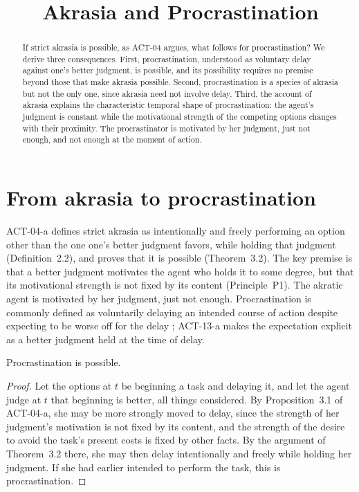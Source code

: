 \documentclass{situationist-preprint}
\title{Akrasia and Procrastination}
\begin{document}
\maketitle

\begin{abstract}
If strict akrasia is possible, as ACT-04 argues, what follows for procrastination? We derive three consequences. First, procrastination, understood as voluntary delay against one's better judgment, is possible, and its possibility requires no premise beyond those that make akrasia possible. Second, procrastination is a species of akrasia but not the only one, since akrasia need not involve delay. Third, the account of akrasia explains the characteristic temporal shape of procrastination: the agent's judgment is constant while the motivational strength of the competing options changes with their proximity. The procrastinator is motivated by her judgment, just not enough, and not enough at the moment of action.
\end{abstract}

\section{From akrasia to procrastination}

ACT-04-a defines strict akrasia as intentionally and freely performing an option other than the one one's better judgment favors, while holding that judgment (Definition~2.2), and proves that it is possible (Theorem~3.2). The key premise is that a better judgment motivates the agent who holds it to some degree, but that its motivational strength is not fixed by its content (Principle~P1). The akratic agent is motivated by her judgment, just not enough. Procrastination is commonly defined as voluntarily delaying an intended course of action despite expecting to be worse off for the delay \citep{Steel2007}; ACT-13-a makes the expectation explicit as a better judgment held at the time of delay.

\begin{proposition}\label{p:poss}
Procrastination is possible.
\end{proposition}

\begin{proof}
Let the options at $t$ be beginning a task and delaying it, and let the agent judge at $t$ that beginning is better, all things considered. By Proposition~3.1 of ACT-04-a, she may be more strongly moved to delay, since the strength of her judgment's motivation is not fixed by its content, and the strength of the desire to avoid the task's present costs is fixed by other facts. By the argument of Theorem~3.2 there, she may then delay intentionally and freely while holding her judgment. If she had earlier intended to perform the task, this is procrastination.
\end{proof}
\end{document}
